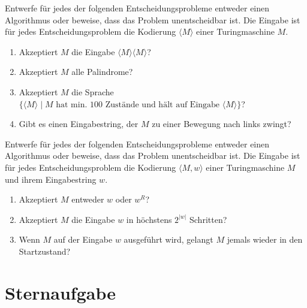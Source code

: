 \documentclass{uebung_cs}
\begin{document}
\begin{exercise}
	Entwerfe für jedes der folgenden Entscheidungsprobleme entweder einen Algorithmus oder beweise, dass das Problem unentscheidbar ist. Die Eingabe ist für jedes Entscheidungsproblem die Kodierung $\langle M \rangle$ einer Turingmaschine $M$.
	\begin{enumerate}
		\item Akzeptiert $M$ die Eingabe $\langle M \rangle \langle M \rangle$?
		\item Akzeptiert $M$ alle Palindrome?
		\item Akzeptiert $M$ die Sprache $\{\langle M \rangle \;|\; M \text{ hat min. 100 Zustände und hält auf Eingabe } \langle M \rangle\}$?
		\item Gibt es einen Eingabestring, der $M$ zu einer Bewegung nach links zwingt?
	\end{enumerate}
\end{exercise}

\begin{exercise}[Entscheidbarkeit IV]
	Entwerfe für jedes der folgenden Entscheidungsprobleme entweder einen Algorithmus oder beweise, dass das Problem unentscheidbar ist. Die Eingabe ist für jedes Entscheidungsproblem die Kodierung $\langle M,w \rangle$ einer Turingmaschine $M$ und ihrem Eingabestring $w$.
	\begin{enumerate}
		\item Akzeptiert $M$ entweder $w$ oder $w^R$?
		\item Akzeptiert $M$ die Eingabe $w$ in höchstens $2^{|w|}$ Schritten?
		\item Wenn $M$ auf der Eingabe $w$ ausgeführt wird, gelangt $M$ jemals wieder in den Startzustand?
	\end{enumerate}
\end{exercise}


\section*{Sternaufgabe}
\end{document}
